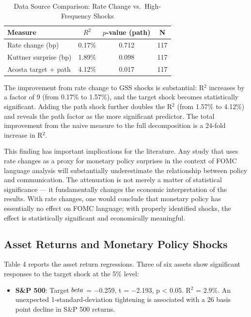 \documentclass[12pt]{article}
\begin{document}
\begin{table}[htbp]\centering\caption{Data Source Comparison: Rate Change vs.\ High-Frequency Shocks}\label{tab:comparison}
\begin{tabular}{lccc}\toprule
Measure & $R^2$ & $p$-value (path) & N \\\midrule
Rate change (bp) & 0.17\% & 0.712 & 117 \\
Kuttner surprise (bp) & 1.89\% & 0.098 & 117 \\
Acosta target + path & 4.12\% & 0.017 & 117 \\\bottomrule
\end{tabular}
\par\vspace{2pt}{\footnotesize All regressions include Newey-West HAC standard errors with lag=4.}
\end{table}

The improvement from rate change to GSS shocks is substantial: R$^2$ increases by a factor of 9 (from 0.17\% to 1.57\%), and the target shock becomes statistically significant. Adding the path shock further doubles the R$^2$ (from 1.57\% to 4.12\%) and reveals the path factor as the more significant predictor. The total improvement from the naive measure to the full decomposition is a 24-fold increase in R$^2$.

This finding has important implications for the literature. Any study that uses rate changes as a proxy for monetary policy surprises in the context of FOMC language analysis will substantially underestimate the relationship between policy and communication. The attenuation is not merely a matter of statistical significance --- it fundamentally changes the economic interpretation of the results. With rate changes, one would conclude that monetary policy has essentially no effect on FOMC language; with properly identified shocks, the effect is statistically significant and economically meaningful.

\subsection{Asset Returns and Monetary Policy Shocks}

Table 4 reports the asset return regressions. Three of six assets show significant responses to the target shock at the 5\% level:

\begin{itemize}
\item \textbf{S\&P 500}: Target $\\beta$ = $-$0.259, t = $-$2.193, p < 0.05. R$^2$ = 2.9\%. An unexpected 1-standard-deviation tightening is associated with a 26 basis point decline in S\&P 500 returns.
\end{itemize}
\end{document}

